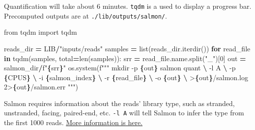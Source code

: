 \documentclass[
]{book}
\newenvironment{Shaded}{\begin{snugshade}}{\end{snugshade}}
\newcommand{\BuiltInTok}[1]{#1}
\newcommand{\ControlFlowTok}[1]{\textcolor[rgb]{0.13,0.29,0.53}{\textbf{#1}}}
\newcommand{\DecValTok}[1]{\textcolor[rgb]{0.00,0.00,0.81}{#1}}
\newcommand{\ImportTok}[1]{#1}
\newcommand{\KeywordTok}[1]{\textcolor[rgb]{0.13,0.29,0.53}{\textbf{#1}}}
\newcommand{\NormalTok}[1]{#1}
\newcommand{\OperatorTok}[1]{\textcolor[rgb]{0.81,0.36,0.00}{\textbf{#1}}}
\newcommand{\SpecialCharTok}[1]{\textcolor[rgb]{0.81,0.36,0.00}{\textbf{#1}}}
\newcommand{\SpecialStringTok}[1]{\textcolor[rgb]{0.31,0.60,0.02}{#1}}
\newcommand{\StringTok}[1]{\textcolor[rgb]{0.31,0.60,0.02}{#1}}
\begin{document}
Quantification will take about 6 minutes. \texttt{tqdm} is a used to display a progress bar.
Precomputed outputs are at \texttt{./lib/outputs/salmon/}.

\begin{Shaded}
\begin{Highlighting}[numbers=left,,]
\ImportTok{from}\NormalTok{ tqdm }\ImportTok{import}\NormalTok{ tqdm}

\NormalTok{reads\_dir }\OperatorTok{=}\NormalTok{ LIB}\OperatorTok{/}\StringTok{"inputs/reads"}
\NormalTok{samples }\OperatorTok{=} \BuiltInTok{list}\NormalTok{(reads\_dir.iterdir())}
\ControlFlowTok{for}\NormalTok{ read\_file }\KeywordTok{in}\NormalTok{ tqdm(samples, total}\OperatorTok{=}\BuiltInTok{len}\NormalTok{(samples)):}
\NormalTok{    srr }\OperatorTok{=}\NormalTok{ read\_file.name.split(}\StringTok{"\_"}\NormalTok{)[}\DecValTok{0}\NormalTok{]}
\NormalTok{    out }\OperatorTok{=}\NormalTok{ salmon\_dir}\OperatorTok{/}\SpecialStringTok{f"}\SpecialCharTok{\{}\NormalTok{srr}\SpecialCharTok{\}}\SpecialStringTok{"}
\NormalTok{    os.system(}\SpecialStringTok{f"""}
\SpecialStringTok{        mkdir {-}p }\SpecialCharTok{\{}\NormalTok{out}\SpecialCharTok{\}}
\SpecialStringTok{        salmon quant }\OperatorTok{\textbackslash{}}
\SpecialStringTok{            {-}l A }\OperatorTok{\textbackslash{}}
\SpecialStringTok{            {-}p }\SpecialCharTok{\{}\NormalTok{CPUS}\SpecialCharTok{\}}\SpecialStringTok{ }\OperatorTok{\textbackslash{}}
\SpecialStringTok{            {-}i }\SpecialCharTok{\{}\NormalTok{salmon\_index}\SpecialCharTok{\}}\SpecialStringTok{ }\OperatorTok{\textbackslash{}}
\SpecialStringTok{            {-}r }\SpecialCharTok{\{}\NormalTok{read\_file}\SpecialCharTok{\}}\SpecialStringTok{ }\OperatorTok{\textbackslash{}}
\SpecialStringTok{            {-}o }\SpecialCharTok{\{}\NormalTok{out}\SpecialCharTok{\}}\SpecialStringTok{ }\OperatorTok{\textbackslash{}}
\SpecialStringTok{            \textgreater{}}\SpecialCharTok{\{}\NormalTok{out}\SpecialCharTok{\}}\SpecialStringTok{/salmon.log 2\textgreater{}}\SpecialCharTok{\{}\NormalTok{out}\SpecialCharTok{\}}\SpecialStringTok{/salmon.err}
\SpecialStringTok{    """}\NormalTok{)}
\end{Highlighting}
\end{Shaded}

Salmon requires information about the reads' library type, such as stranded, unstranded, facing, paired-end, etc. \texttt{-l\ A} will tell Salmon to infer the type
from the first 1000 reads. \href{https://salmon.readthedocs.io/en/latest/salmon.html\#what-s-this-libtype}{More information is here.}
\end{document}
